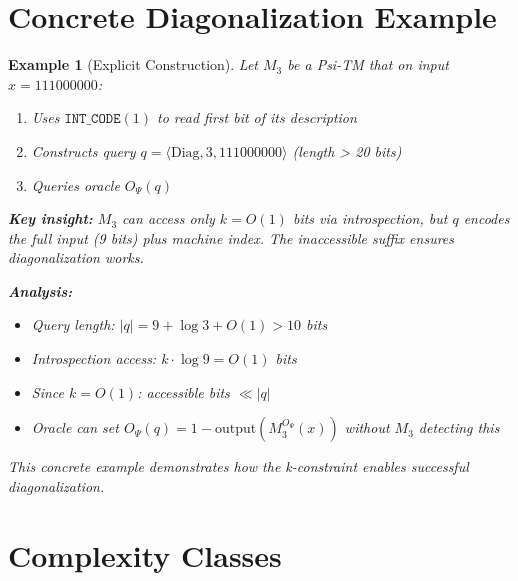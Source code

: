\documentclass[11pt]{article}
\newtheorem{example}{Example}
\begin{document}

\section{Concrete Diagonalization Example}

\begin{example}[Explicit Construction]
\label{ex:concrete-diagonalization}
Let $M_3$ be a Psi-TM that on input $x = 111000000$:
\begin{enumerate}
\item Uses $\texttt{INT\_CODE}(1)$ to read first bit of its description
\item Constructs query $q = \langle \text{Diag}, 3, 111000000 \rangle$ (length > 20 bits)
\item Queries oracle $O_\Psi(q)$
\end{enumerate}

\textbf{Key insight:} $M_3$ can access only $k=O(1)$ bits via introspection, but $q$ encodes the full input (9 bits) plus machine index. The inaccessible suffix ensures diagonalization works.

\textbf{Analysis:}
\begin{itemize}
\item Query length: $|q| = 9 + \log 3 + O(1) > 10$ bits
\item Introspection access: $k \cdot \log 9 = O(1)$ bits
\item Since $k = O(1)$: accessible bits $\ll |q|$
\item Oracle can set $O_\Psi(q) = 1 - \text{output}(M_3^{O_\Psi}(x))$ without $M_3$ detecting this
\end{itemize}

This concrete example demonstrates how the k-constraint enables successful diagonalization.
\end{example}

\section{Complexity Classes}
\end{document}
